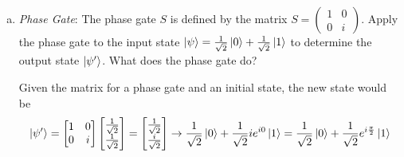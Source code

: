 \documentclass[10pt,letterpaper]{article}
\begin{document}
\begin{enumerate}
\begin{enumerate}[a)]
\begin{enumerate}[a.]
\item $\ket{\psi} = \ket{1}$

\color{violet}
For $\ket{1}$, an operation on $\ket{1}$ looks like
\begin{gather*}
\ket{\psi'} = \frac{1}{\sqrt{2}}\begin{bmatrix}
1 & 1 \\
1 & -1 
\end{bmatrix}\begin{bmatrix}
0 \\
1 
\end{bmatrix} = \frac{1}{\sqrt{2}}\begin{bmatrix}
1 \\
-1 
\end{bmatrix} = \begin{bmatrix}
\frac{1}{\sqrt{2}} \\
-\frac{1}{\sqrt{2}}
\end{bmatrix}
\end{gather*}
\color{black}

\end{enumerate}

What does the Hadamard gate do?

\color{violet}
The Hadamard gate puts a pure state into a mixed state with two possible outcomes for measurement, a superposition.
\color{black}

\item \textit{Phase Gate}: The phase gate $S$ is defined by the matrix $S = \begin{pmatrix}
1 & 0 \\
0 & i
\end{pmatrix}$. Apply the phase gate to the input state $\ket{\psi} = \frac{1}{\sqrt{2}}\ket{0} + \frac{1}{\sqrt{2}}\ket{1}$ to determine the output state $\ket{\psi'}$. What does the phase gate do?

\color{violet}
Given the matrix for a phase gate and an initial state, the new state would be
\begin{gather*}
\ket{\psi'} = \begin{bmatrix}
1 & 0 \\
0 & i 
\end{bmatrix}\begin{bmatrix}
\frac{1}{\sqrt{2}} \\
\frac{1}{\sqrt{2}} 
\end{bmatrix} = \begin{bmatrix}
\frac{1}{\sqrt{2}} \\
\frac{i}{\sqrt{2}} 
\end{bmatrix} \rightarrow \frac{1}{\sqrt{2}}\ket{0} + \frac{1}{\sqrt{2}}ie^{i0}\ket{1} = \frac{1}{\sqrt{2}}\ket{0} + \frac{1}{\sqrt{2}}e^{i\frac{\pi}{2}}\ket{1}
\end{gather*}
\color{black}


\end{enumerate}
\end{enumerate}
\end{document}
